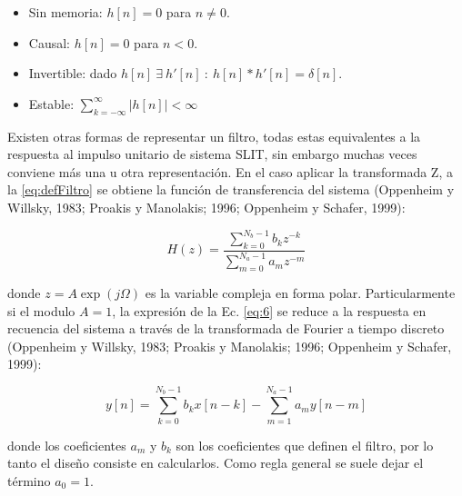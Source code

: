 \documentclass[conference]{IEEEtran}
\begin{document}
\begin{itemize}
\item Sin memoria: \(h[n]=0\) para \(n \neq 0\).
\item Causal: \(h[n]=0\) para \(n<0\).
\item Invertible: dado \(h[n]\: \exists \:h'[n]\::\:h[n]*h'[n]=\delta[n]\).
\item Estable: \(\sum_{k=-\infty}^{\infty}{|h[n]|<\infty}\)
\end{itemize}

Existen otras formas de representar un filtro, todas estas equivalentes a la respuesta al impulso unitario de sistema SLIT, sin embargo muchas veces conviene más una u otra representación. En el caso aplicar la transformada Z, a la \ref{eq:defFiltro} se obtiene la función de transferencia del sistema (Oppenheim y Willsky, 1983; Proakis y Manolakis; 1996; Oppenheim y Schafer, 1999):

\begin{equation}
    H(z) = \frac{\sum_{k=0}^{N_b-1}{b_k z^{-k}}}{\sum_{m=0}^{N_a-1}{a_m z^{-m}}}
    \label{eq:6}
\end{equation}

donde \(z=A\exp(j\Omega)\) es la variable compleja en forma polar. Particularmente si el modulo \(A=1\), la expresión de la Ec. \ref{eq:6} se reduce a la respuesta en recuencia del sistema a través de la transformada de Fourier a tiempo discreto (Oppenheim y Willsky, 1983; Proakis y Manolakis; 1996; Oppenheim y Schafer, 1999):

\begin{equation}
    y[n] = \sum_{k=0}^{N_b-1}{b_k x[n-k]} - \sum_{m=1}^{N_a-1}{a_m y[n-m]}
\end{equation}

donde los coeficientes \(a_m\) y \(b_k\) son los coeficientes que definen el filtro, por lo tanto el diseño consiste en calcularlos. Como regla general se suele dejar el término \(a_0=1\).
\end{document}
